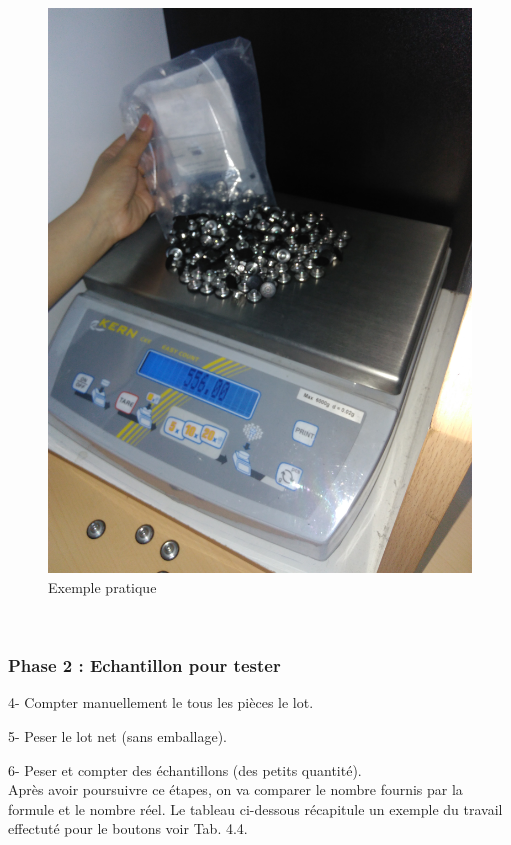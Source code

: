 \documentclass[12pt, a4paper]{thesis}
\begin{document}
\begin{figure}[!h]
\begin{center}
\includegraphics[scale=0.025]{a2.jpg}
\caption{Exemple pratique}
\end{center}
\end{figure}\\







\subsubsection{Phase 2 : Echantillon pour tester}
\item 4- Compter manuellement le tous les pièces le lot.
\item 5- Peser le lot net (sans emballage).
\item 6- Peser et compter des échantillons (des petits quantité).\\

 Après avoir poursuivre ce étapes, on va comparer le nombre fournis par la formule et le nombre réel. Le tableau ci-dessous récapitule un exemple du travail effectuté pour le boutons voir Tab. 4.4.\\
\end{document}
